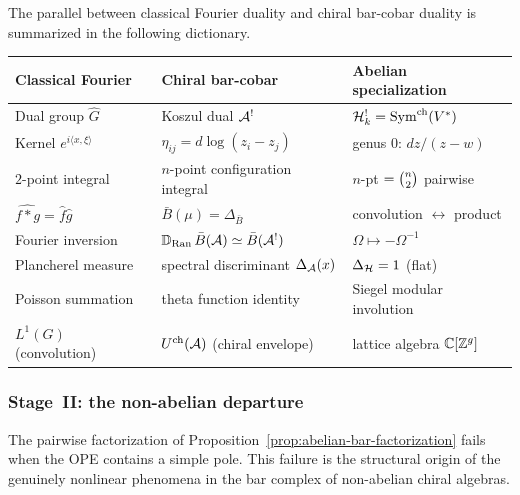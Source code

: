 The parallel between classical Fourier duality and chiral bar-cobar
duality is summarized in the following dictionary.

\medskip
\begin{center}
\small
\renewcommand{\arraystretch}{1.35}
\begin{tabular}{@{}lll@{}}
\hline
\textbf{Classical Fourier} & \textbf{Chiral bar-cobar}
  & \textbf{Abelian specialization} \\
\hline
Dual group $\hat{G}$
  & Koszul dual $\mathcal{A}^!$
  & $\mathcal{H}_k^! = \mathrm{Sym}^{\mathrm{ch}}(V^*)$ \\[2pt]
Kernel $e^{i\langle x,\xi\rangle}$
  & $\eta_{ij} = d\log(z_i - z_j)$
  & genus $0$: $dz/(z-w)$ \\[2pt]
$2$-point integral
  & $n$-point configuration integral
  & $n$-pt $= \tbinom{n}{2}$ pairwise \\[2pt]
$\widehat{f * g} = \hat{f}\hat{g}$
  & $\bar{B}(\mu) = \Delta_{\bar{B}}$
  & convolution $\leftrightarrow$ product \\[2pt]
Fourier inversion
  & $\mathbb{D}_{\mathrm{Ran}}\, \bar{B}(\mathcal{A})
    \simeq \bar{B}(\mathcal{A}^!)$
  & $\Omega \mapsto -\Omega^{-1}$ \\[2pt]
Plancherel measure
  & spectral discriminant $\Delta_{\mathcal{A}}(x)$
  & $\Delta_{\mathcal{H}} = 1$ (flat) \\[2pt]
Poisson summation
  & theta function identity
  & Siegel modular involution \\[2pt]
$L^1(G)$ (convolution)
  & $U^{\mathrm{ch}}(\mathcal{A})$ (chiral envelope)
  & lattice algebra $\mathbb{C}[\mathbb{Z}^g]$ \\
\hline
\end{tabular}
\end{center}
\medskip

\subsubsection{Stage~II: the non-abelian departure}

The pairwise factorization of
Proposition~\ref{prop:abelian-bar-factorization} fails when the OPE
contains a simple pole.  This failure is the structural origin of
the genuinely nonlinear phenomena in the bar complex of non-abelian
chiral algebras.

